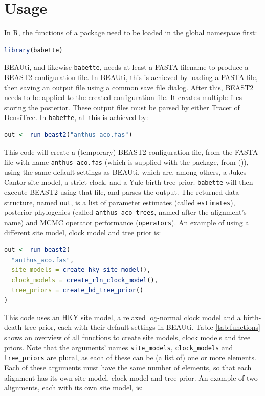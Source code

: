 \documentclass{article}
\begin{document}
\section{Usage}

In R, the functions of a package need to be loaded in the global namespace first:

\begin{lstlisting}[language=R, floatplacement=H]
library(babette)
\end{lstlisting}
BEAUti, and likewise \verb;babette;, needs at least a FASTA filename
to produce a BEAST2 configuration file. 
In BEAUti, this is achieved by loading a FASTA file, 
then saving an output file using a common
save file dialog. After this, BEAST2 needs to be applied to
the created configuration file. It creates multiple files
storing the posterior. These output
files must be parsed by either Tracer of DensiTree.
In \verb;babette;, all this is achieved by:

\begin{lstlisting}[language=R, floatplacement=H]
out <- run_beast2("anthus_aco.fas")
\end{lstlisting}
This code will create a (temporary) BEAST2 configuration file,
from the FASTA file with name \verb;anthus_aco.fas; (which
is supplied with the package, from (\cite{VanEls2018})), 
using the same default settings as BEAUti, which are, 
among others, a Jukes-Cantor site model, a strict clock, and a Yule birth tree prior.
\verb;babette; will then execute BEAST2 using that file, and
parses the output. The returned data structure, named \verb;out;, 
is a list of parameter estimates (called \verb;estimates;), posterior 
phylogenies (called \verb;anthus_aco_trees;, named after
the alignment's name) and MCMC operator performance (\verb;operators;).
An example of using a different site model, clock model 
and tree prior is:

\begin{lstlisting}[language=R, floatplacement=H]
out <- run_beast2(
  "anthus_aco.fas",
  site_models = create_hky_site_model(),
  clock_models = create_rln_clock_model(),
  tree_priors = create_bd_tree_prior()
)
\end{lstlisting}
This code uses an HKY site model, a relaxed log-normal clock model and a 
birth-death tree prior, each with their default settings in BEAUti.
Table \ref{tab:functions} shows an overview of all functions to 
create site models, clock models and tree priors.
Note that the arguments' names \verb;site_models;, \verb;clock_models; 
and \verb;tree_priors; are plural, as each of these
can be (a list of) one or more elements. Each of these arguments must 
have the same number of elements, so that each alignment has its
own site model, clock model and tree prior. 
An example of two alignments, each with its own site model, is:
\end{document}
